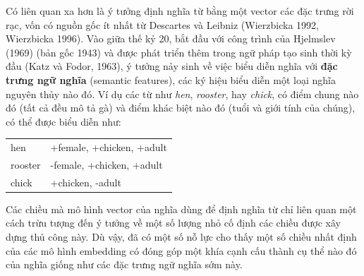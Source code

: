 Có liên quan xa hơn là ý tưởng định nghĩa từ bằng một vector các đặc trưng rời rạc, vốn có nguồn gốc ít nhất từ Descartes và Leibniz (Wierzbicka 1992, Wierzbicka 1996). Vào giữa thế kỷ 20, bắt đầu với công trình của Hjelmslev (1969) (bản gốc 1943) và được phát triển thêm trong ngữ pháp tạo sinh thời kỳ đầu (Katz và Fodor, 1963), ý tưởng nảy sinh về việc biểu diễn nghĩa với \textbf{đặc trưng ngữ nghĩa} (semantic features), các ký hiệu biểu diễn một loại nghĩa nguyên thủy nào đó. Ví dụ các từ như \emph{hen}, \emph{rooster}, hay \emph{chick}, có điểm chung nào đó (tất cả đều mô tả gà) và điểm khác biệt nào đó (tuổi và giới tính của chúng), có thể được biểu diễn như:

\begin{center}
\begin{tabular}{ll}
hen & +female, +chicken, +adult \\
rooster & -female, +chicken, +adult \\
chick & +chicken, -adult \\
\end{tabular}
\end{center}

Các chiều mà mô hình vector của nghĩa dùng để định nghĩa từ chỉ liên quan một cách trừu tượng đến ý tưởng về một số lượng nhỏ cố định các chiều được xây dựng thủ công này. Dù vậy, đã có một số nỗ lực cho thấy một số chiều nhất định của các mô hình embedding có đóng góp một khía cạnh cấu thành cụ thể nào đó của nghĩa giống như các đặc trưng ngữ nghĩa sớm này.

